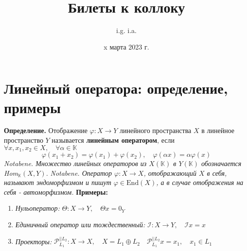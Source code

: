 \documentclass{article}
\title{\textbf{Билеты к коллоку}}
\author{i.g. i.a.}
\date{x марта 2023 г.}
\newcommand*{\notabene}[1]{\textit{Notabene. #1.} \newline}
\newcommand*{\definition}[1]{\textbf{Определение.} #1 \newline}
\newcommand*{\Hom}[2]{Hom$_\mathbb{K}(#1, #2)$}
\begin{document}
\tableofcontents
\maketitle

\section{Линейный оператора: определение, примеры}
\definition{Отображение $\varphi: X \to Y$ линейного пространства $X$ в линейное пространство $Y$ называется \textbf{линейным оператором}, если $\forall x, x_1, x_2 \in X, \quad \forall \alpha \in \mathbb{K}$}
$$
    \varphi(x_1 + x_2) = \varphi(x_1) + \varphi(x_2), \quad \varphi(\alpha x) = \alpha \varphi(x)
$$
\notabene{Множество линейных операторов из $X(\mathbb{K})$ в $Y(\mathbb{K})$ обозначается \Hom{X}{Y}}
\newline
\notabene{Оператор $\varphi: X \to X$, отображающий $X$ в себя, называют \textit{эндоморфизмом} и пишут $\varphi \in \text{End}(X)$, а в случае отображения на себя - \textit{автоморфизмом}}
\newline
\textbf{Примеры:} 
\begin{enumerate}
    \item \textit{Нульоператор: } $\Theta: X \to Y, \quad \Theta x = 0_Y$
    \item \textit{Единичный оператор или тождественный: } $\mathcal I: X \to Y, \quad \mathcal Ix = x$
    \item \textit{Проекторы: } $\mathcal P_{L_1}^{|| L_2}: X \to X, \quad X = L_1 \oplus L_2 \quad \mathcal P_{L_1}^{|| L_2} x = x_1, \quad x_1 \in L_1$
\end{enumerate}
\end{document}
